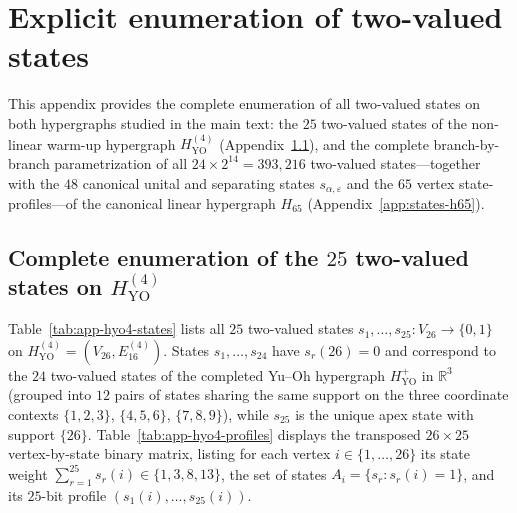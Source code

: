\documentclass[
  aps,
  pra,
  reprint,
  superscriptaddress,
  amsmath,
  amssymb,
  nofootinbib,
  floatfix
]{revtex4-2}
\theoremstyle{definition}
\theoremstyle{remark}
\newcommand{\R}{\mathbb{R}}
\newcommand{\YO}{\mathrm{YO}}
\begin{document}
\section{Explicit enumeration of two-valued states}

This appendix provides the complete enumeration of all two-valued states on both hypergraphs studied in the main text: the $25$ two-valued states of the non-linear warm-up hypergraph $H_{\YO}^{(4)}$ (Appendix~\ref{app:states-hyo4}), and the complete branch-by-branch parametrization of all $24\times 2^{14}=393{,}216$ two-valued states---together with the $48$ canonical unital and separating states $s_{\alpha,\varepsilon}$ and the $65$ vertex state-profiles---of the canonical linear hypergraph $H_{65}$ (Appendix~\ref{app:states-h65}).

\subsection{Complete enumeration of the \texorpdfstring{$25$}{25} two-valued states on \texorpdfstring{$H_{\YO}^{(4)}$}{H\_YO\^(4)}}\label{app:states-hyo4}

Table~\ref{tab:app-hyo4-states} lists all $25$ two-valued states $s_1,\ldots,s_{25}:V_{26}\to\{0,1\}$ on $H_{\YO}^{(4)}=(V_{26},E_{16}^{(4)})$. States $s_1,\ldots,s_{24}$ have $s_r(26)=0$ and correspond to the $24$ two-valued states of the completed Yu--Oh hypergraph $H_{\YO}^{+}$ in $\R^3$ (grouped into $12$ pairs of states sharing the same support on the three coordinate contexts $\{1,2,3\}$, $\{4,5,6\}$, $\{7,8,9\}$), while $s_{25}$ is the unique apex state with support $\{26\}$. Table~\ref{tab:app-hyo4-profiles} displays the transposed $26\times 25$ vertex-by-state binary matrix, listing for each vertex $i\in\{1,\ldots,26\}$ its state weight $\sum_{r=1}^{25}s_r(i)\in\{1,3,8,13\}$, the set of states $A_i=\{s_r : s_r(i)=1\}$, and its $25$-bit profile $(s_1(i),\ldots,s_{25}(i))$.
\end{document}
